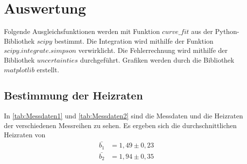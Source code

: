 \section{Auswertung}
\label{sec:auswertung}


Folgende Ausgleichsfunktionen werden mit Funktion $curve\_fit$ aus der Python\cite{py}-Bibliothek $scipy$\cite{2020SciPy-NMeth} bestimmt.
Die Integration wird mithilfe der Funktion $scipy.integrate.simpson$ \cite{2020SciPy-NMeth}verwirklicht.%
Die Fehlerrechnung wird mithilfe der Bibliothek $uncertainties$ \cite{unp} durchgeführt.
Grafiken werden durch die Bibliothek $matplotlib$\cite{Hunter:2007} erstellt. 

\subsection{Bestimmung der Heizraten}

In \autoref{tab:Messdaten1} und \autoref{tab:Messdaten2} sind die Messdaten und die Heizraten der verschiedenen Messreihen zu sehen.
Es ergeben sich die durchschnittlichen Heizraten von 
\begin{align}
    \bar{b_1} &=   1,49 \pm  0,23 \label{eq:TheoH1} \\
    \bar{b_2} &=   1,94 \pm  0,35 \label{eq:TheoH2} 
\end{align}

